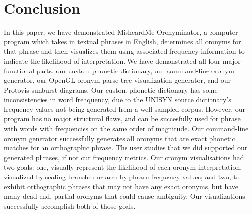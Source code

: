 \chapter{Conclusion}
\label{conclusion}

In this paper, we have demonstrated  MisheardMe Oronyminator, a computer program which takes in textual phrases in English, determines all oronyms for that phrase and then visualizes them using associated frequency information to indicate the likelihood of interpretation.
We have demonstrated all four major functional parts: our custom phonetic dictionary, our command-line oronym generator, our OpenGL oronym-parse-tree visualization generator, and our Protovis sunburst diagrams.  Our custom phonetic dictionary has some inconsistencies in word frenquency, due to the UNISYN source dictionary's frequency values not being generated from a well-sampled corpus. However, our program has no major structural flaws, and can be succesfully used for phrase with words with frequencies on the same order of magnitude. Our command-line oronym generator successfully generates all oronyms that are exact phonetic matches for an orthographic phrase.  The user studies that we did supported our generated phrases, if not our frequency metrics.  Our oronym visualizations had two goals: one, visually represent the likelihood of each oronym interpretation, visualized by scaling branches or arcs by phrase frequency values; and two, to exhibit orthographic phrases that may not have any exact oronyms, but have many dead-end, partial oronyms that could cause ambiguity. Our visualizations successfully accomplish both of those goals.
